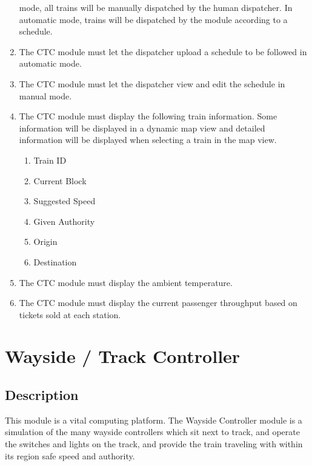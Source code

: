 \documentclass{scrreprt}
\begin{document}
\begin{enumerate}
    mode, all trains will be manually dispatched by the human dispatcher. In automatic
    mode, trains will be dispatched by the module according to a schedule.
    \item The CTC module must let the dispatcher upload a schedule to be followed in
    automatic mode.
    \item The CTC module must let the dispatcher view and edit the schedule in manual mode.
    \item The CTC module must display the following train information. Some information
    will be displayed in a dynamic map view and detailed information will be displayed
    when selecting a train in the map view.
    \begin{enumerate}
        \item Train ID
        \item Current Block
        \item Suggested Speed
        \item Given Authority
        \item Origin
        \item Destination
    \end{enumerate}
    \item The CTC module must display the ambient temperature.
    \item The CTC module must display the current passenger throughput based on tickets
    sold at each station.
\end{enumerate}


\section{Wayside / Track Controller}

\subsection{Description}
This module is a vital computing platform.
The Wayside Controller module is a simulation of the many wayside controllers which sit next to track, and operate the switches and lights on the track, and provide the train traveling with within its region safe speed and authority.
\end{document}
